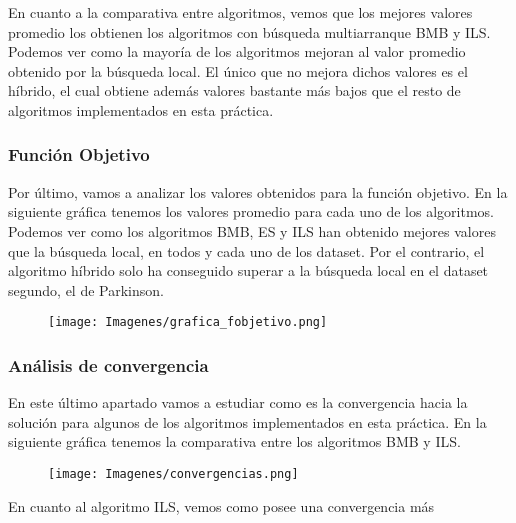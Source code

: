 \documentclass[10pt, a4paper]{article}
\theoremstyle{theorem-style}
\theoremstyle{theorem-style}
\theoremstyle{theorem2-style}
\theoremstyle{definition-style}
\theoremstyle{remark-style}
\theoremstyle{example-style}
\theoremstyle{definition-style}
\theoremstyle{remark-style}
\theoremstyle{remark-style}
\begin{document}
En cuanto a la comparativa entre algoritmos, vemos que los mejores valores promedio los obtienen los algoritmos con búsqueda multiarranque BMB y ILS. Podemos ver como la mayoría de los algoritmos mejoran al valor promedio obtenido por la búsqueda local. El único que no mejora dichos valores es el híbrido, el cual obtiene además valores bastante más bajos que el resto de algoritmos implementados en esta práctica. 

\newpage
\subsubsection{Función Objetivo}

Por último, vamos a analizar los valores obtenidos para la función objetivo. En la siguiente gráfica tenemos los valores promedio para cada uno de los algoritmos. Podemos ver como los algoritmos BMB, ES y ILS han obtenido mejores valores que la búsqueda local, en todos y cada uno de los dataset. Por el contrario, el algoritmo híbrido solo ha conseguido superar a la búsqueda local en el dataset segundo, el de Parkinson. 

\begin{figure}[htp]
\centering
\texttt{[image: Imagenes/grafica\_fobjetivo.png]}
\label{}
\end{figure}

\subsubsection{Análisis de convergencia}

En este último apartado vamos a estudiar como es la convergencia hacia la solución para algunos de los algoritmos implementados en esta práctica. En la siguiente gráfica tenemos la comparativa entre los algoritmos BMB y ILS.  

\begin{figure}[htp]
\centering
\texttt{[image: Imagenes/convergencias.png]}
\label{}
\end{figure}

En cuanto al algoritmo ILS, vemos como posee una convergencia más 
\end{document}
